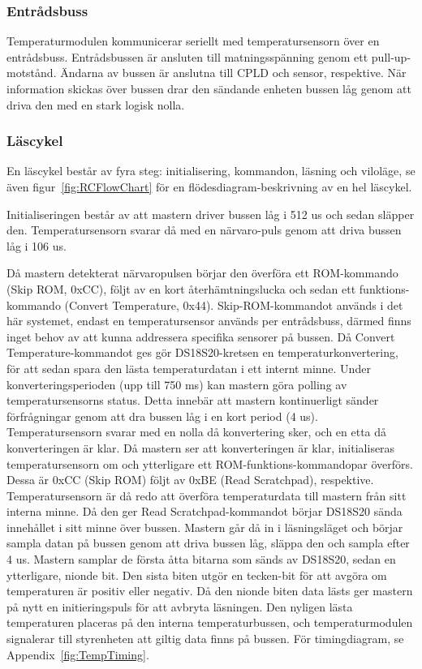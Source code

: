 \documentclass[a4paper,11pt]{article}
\begin{document}
	\subsubsection{Entrådsbuss}

	Temperaturmodulen kommunicerar seriellt med temperatursensorn över en entrådsbuss.
	Entrådsbussen är ansluten till matningsspänning genom ett pull-up-motstånd.
	Ändarna av bussen är anslutna till CPLD och sensor, respektive. När information
	skickas över bussen drar den sändande enheten bussen låg genom att driva den
	med en stark logisk nolla.

	\subsubsection{Läscykel}

	En läscykel består av fyra steg: initialisering, kommandon, läsning och viloläge,
	se även figur~\ref{fig:RCFlowChart} för en flödesdiagram-beskrivning av en hel läscykel.

	Initialiseringen består av att mastern driver bussen låg i 512 us och sedan släpper den.
	Temperatursensorn svarar då med en närvaro-puls genom att driva bussen låg i 106 us.

	Då mastern detekterat närvaropulsen börjar den överföra ett ROM-kommando (Skip ROM, 0xCC), följt av en kort återhämtningslucka och sedan ett funktions-kommando (Convert Temperature, 0x44).
	Skip-ROM-kommandot används i det här systemet, endast en temperatursensor används per entrådsbuss, därmed finns inget behov av att kunna addressera specifika sensorer på bussen.
	Då Convert Temperature-kommandot ges gör DS18S20-kretsen en temperaturkonvertering, för att sedan spara den lästa temperaturdatan i ett internt minne.
	Under konverteringsperioden (upp till 750 ms) kan mastern göra polling av temperatursensorns status. Detta innebär att mastern kontinuerligt
	sänder förfrågningar genom att dra bussen låg i en kort period (4 us). Temperatursensorn svarar med en nolla
	då konvertering sker, och en etta då konverteringen är klar.
	Då mastern ser att konverteringen är klar, initialiseras temperatursensorn om och ytterligare ett ROM-funktions-kommandopar överförs. Dessa är 0xCC (Skip ROM) följt av 0xBE (Read Scratchpad), respektive.
	Temperatursensorn är då redo att överföra temperaturdata till mastern från sitt interna minne.
	Då den ger Read Scratchpad-kommandot börjar DS18S20 sända innehållet i sitt minne över bussen.
	Mastern går då in i läsningsläget och börjar sampla datan på bussen genom att driva bussen låg, släppa den och sampla efter 4 us.
	Mastern samplar de första åtta bitarna som sänds av DS18S20, sedan en ytterligare, nionde bit. 
	Den sista biten utgör en tecken-bit för att avgöra om temperaturen är positiv eller negativ. Då den nionde biten data lästs
	ger mastern på nytt en initieringspuls för att avbryta läsningen.
	Den nyligen lästa temperaturen placeras på den interna temperaturbussen, och temperaturmodulen signalerar till styrenheten att giltig data finns på bussen. För timingdiagram, se Appendix~\ref{fig:TempTiming}.
\end{document}
